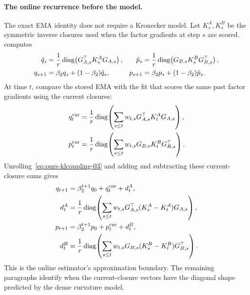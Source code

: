 \paragraph{The online recurrence before the model.}
The exact EMA identity does not require a Kronecker model. Let
$K^A_s,K^B_s$ be the symmetric inverse closures used when the factor gradients
at step $s$ are scored.  computes
\begin{equation}\label{eq:ours-klcoupling-03}
\begin{aligned}
  \hat q_s
    &= \frac1r\operatorname{diag}\!\left(G_{A,s}^\top K^A_sG_{A,s}\right),
  &
  \hat p_s
    &= \frac1r\operatorname{diag}\!\left(G_{B,s}K^B_sG_{B,s}^\top\right),
  \\
  q_{s+1}
    &= \beta_2q_s+(1-\beta_2)\hat q_s,
  &
  p_{s+1}
    &= \beta_2p_s+(1-\beta_2)\hat p_s .
\end{aligned}
\end{equation}
At time $t$, compare the stored EMA with the fit that scores the same past
factor gradients using the current closures:
\[
\begin{aligned}
  q^{\mathrm{cur}}_t
  &=
  \frac1r\operatorname{diag}\!\left(
    \sum_{s\le t}w_{t,s}G_{A,s}^\top K^A_tG_{A,s}
  \right),
  \\
  p^{\mathrm{cur}}_t
  &=
  \frac1r\operatorname{diag}\!\left(
    \sum_{s\le t}w_{t,s}G_{B,s}K^B_tG_{B,s}^\top
  \right).
\end{aligned}
\]
Unrolling~\eqref{eq:ours-klcoupling-03} and adding and subtracting these
current-closure sums gives
\begin{equation}\label{eq:online-current-closure-03}
\begin{aligned}
  q_{t+1}
  &=
  \beta_2^{t+1}q_0+q^{\mathrm{cur}}_t+d^A_t,\\
  d^A_t
  &=
  \frac1r\operatorname{diag}\!\left(
    \sum_{s\le t}w_{t,s}
    G_{A,s}^\top(K^A_s-K^A_t)G_{A,s}
  \right),\\
  p_{t+1}
  &=
  \beta_2^{t+1}p_0+p^{\mathrm{cur}}_t+d^B_t,\\
  d^B_t
  &=
  \frac1r\operatorname{diag}\!\left(
    \sum_{s\le t}w_{t,s}
    G_{B,s}(K^B_s-K^B_t)G_{B,s}^\top
  \right).
\end{aligned}
\end{equation}
This is the online estimator's approximation boundary. The remaining paragraphs
identify when the current-closure vectors have the diagonal shape predicted by
the dense curvature model.

